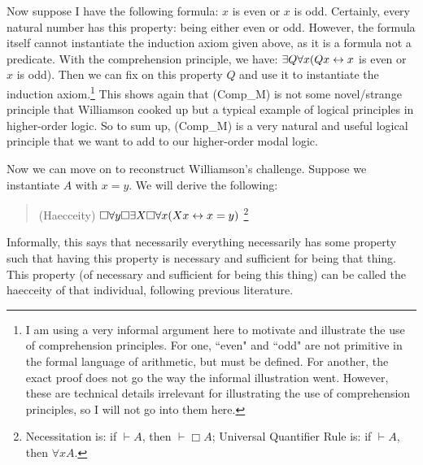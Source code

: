 Now suppose I have the following formula: $x$ is even or $x$ is odd. Certainly, every natural number has this property: being either even or odd. However, the formula itself cannot instantiate the induction axiom given above, as it is a formula not a predicate. With the comprehension principle, we have: $\exists Q \forall x (Qx \leftrightarrow x $ is even or $ x $ is odd)$ $. Then we can fix on this property $Q$ and use it to instantiate the induction axiom.\footnote{I am using a very informal argument here to motivate and illustrate the use of comprehension principles. For one, ``even" and ``odd" are not primitive in the formal language of arithmetic, but must be defined. For another, the exact proof does not go the way the informal illustration went. However, these are technical details irrelevant for illustrating the use of comprehension principles, so I will not go into them here.}
This shows again that (Comp_M) is not some novel/strange principle that Williamson cooked up but a typical example of logical principles in higher-order logic. So to sum up, (Comp_M) is a very natural and useful logical principle that we want to add to our higher-order modal logic. 

Now we can move on to reconstruct Williamson's challenge. Suppose we instantiate $A$ with $x=y$. We will derive the following:
\begin{quote}
(Haecceity) $\Box \forall y \Box \exists X \Box \forall x (Xx \leftrightarrow x=y)$ \footnote{Necessitation is: if $\vdash A$, then $\vdash \Box A$; Universal Quantifier Rule is: if $\vdash A$, then $\forall x A$. }
\end{quote}
Informally, this says that necessarily everything necessarily has some property such that having this property is necessary and sufficient for being that thing. This property (of necessary and sufficient for being this thing) can be called the haecceity of that individual, following previous literature. 

